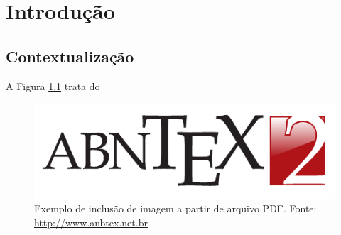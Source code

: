 %

\chapter{Introdução}

\listfigurename

\lipsum[3]

\section{Contextualização}
A Figura \ref{fig:fig01} trata do \lipsum[1-3]

\begin{figure}[!htb]
	\label{fig:fig01}
	\begin{center}
		\includegraphics[scale=0.60]{capitulos/imgs/abntex2-modelo-img-marca.pdf}
	\end{center}
	\caption{Exemplo de inclusão de imagem a partir de arquivo PDF. Fonte: \url{http://www.anbtex.net.br}}
\end{figure}

\lipsum[3]
